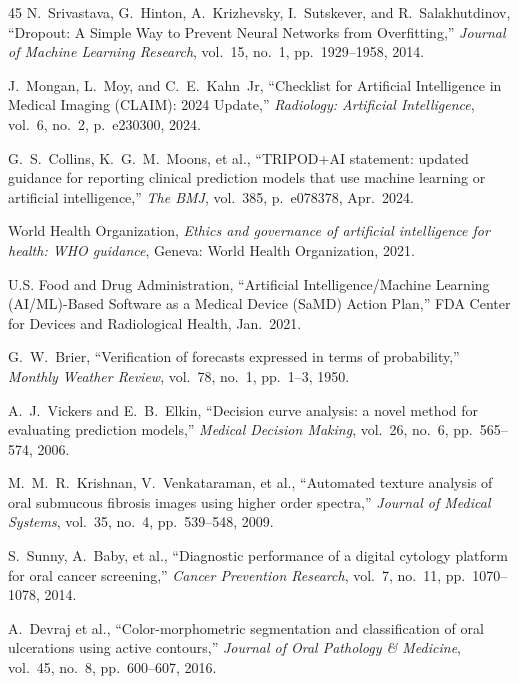 \documentclass[12pt,a4paper,oneside]{report}
\begin{document}
\begin{thebibliography}{45}
N.~Srivastava, G.~Hinton, A.~Krizhevsky, I.~Sutskever, and R.~Salakhutdinov, ``Dropout: A Simple Way to Prevent Neural Networks from Overfitting,'' \textit{Journal of Machine Learning Research}, vol.~15, no.~1, pp.~1929--1958, 2014.

J.~Mongan, L.~Moy, and C.~E.~Kahn~Jr, ``Checklist for Artificial Intelligence in Medical Imaging (CLAIM): 2024 Update,'' \textit{Radiology: Artificial Intelligence}, vol.~6, no.~2, p.~e230300, 2024.

G.~S.~Collins, K.~G.~M.~Moons, et al., ``TRIPOD+AI statement: updated guidance for reporting clinical prediction models that use machine learning or artificial intelligence,'' \textit{The BMJ}, vol.~385, p.~e078378, Apr.~2024.

World Health Organization, \textit{Ethics and governance of artificial intelligence for health: WHO guidance}, Geneva: World Health Organization, 2021.

U.S. Food and Drug Administration, ``Artificial Intelligence/Machine Learning (AI/ML)-Based Software as a Medical Device (SaMD) Action Plan,'' FDA Center for Devices and Radiological Health, Jan.~2021.

G.~W.~Brier, ``Verification of forecasts expressed in terms of probability,'' \textit{Monthly Weather Review}, vol.~78, no.~1, pp.~1--3, 1950.

A.~J.~Vickers and E.~B.~Elkin, ``Decision curve analysis: a novel method for evaluating prediction models,'' \textit{Medical Decision Making}, vol.~26, no.~6, pp.~565--574, 2006.

M.~M.~R.~Krishnan, V.~Venkataraman, et al., ``Automated texture analysis of oral submucous fibrosis images using higher order spectra,'' \textit{Journal of Medical Systems}, vol.~35, no.~4, pp.~539--548, 2009.

S.~Sunny, A.~Baby, et al., ``Diagnostic performance of a digital cytology platform for oral cancer screening,'' \textit{Cancer Prevention Research}, vol.~7, no.~11, pp.~1070--1078, 2014.

A.~Devraj et al., ``Color-morphometric segmentation and classification of oral ulcerations using active contours,'' \textit{Journal of Oral Pathology \& Medicine}, vol.~45, no.~8, pp.~600--607, 2016.


\end{thebibliography}
\end{document}
